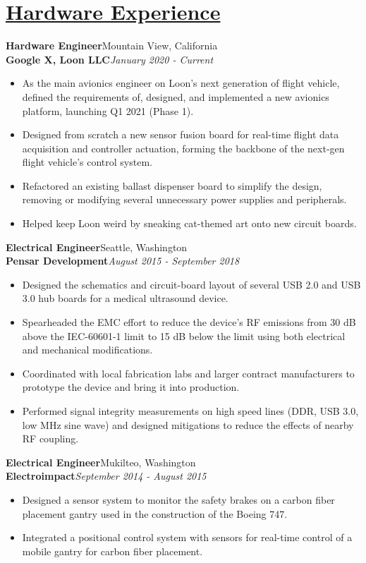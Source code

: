 \documentclass[a4paper, 11pt]{article}
\begin{document}
\section{\underline{Hardware Experience}}
  \textbf{Hardware Engineer}\hfill Mountain View, California\\
  \textbf{Google X, Loon LLC}\hfill \emph{January 2020 - Current}\smallskip
  \begin{itemize}[nosep]
    \item As the main avionics engineer on Loon's next generation of flight vehicle, defined the requirements of, designed, and implemented a new avionics platform, launching Q1 2021 (Phase 1).
    \item Designed from scratch a new sensor fusion board for real-time flight data acquisition and controller actuation, forming the backbone of the next-gen flight vehicle's control system.
    \item Refactored an existing ballast dispenser board to simplify the design, removing or modifying several unnecessary power supplies and peripherals.
    \item Helped keep Loon weird by sneaking cat-themed art onto new circuit boards.
  \end{itemize}
  \medbreak
  
  \textbf{Electrical Engineer}\hfill Seattle, Washington\\
  \textbf{Pensar Development}\hfill \emph{August 2015 - September 2018}\smallskip
  \begin{itemize}[nosep]
    \item Designed the schematics and circuit-board layout of several USB 2.0 and USB 3.0 hub boards for a medical ultrasound device.
    \item Spearheaded the EMC effort to reduce the device's RF emissions from 30 dB above the IEC-60601-1 limit to 15 dB below the limit using both electrical and mechanical modifications.
    \item Coordinated with local fabrication labs and larger contract manufacturers to prototype the device and bring it into production.
    \item Performed signal integrity measurements on high speed lines (DDR, USB 3.0, low MHz sine wave) and designed mitigations to reduce the effects of nearby RF coupling.
  \end{itemize}
  \medskip
  
  \textbf{Electrical Engineer}\hfill Mukilteo, Washington\\
  \textbf{Electroimpact}\hfill \emph{September 2014 - August 2015}\smallskip
  \begin{itemize}[nosep]
    \item Designed a sensor system to monitor the safety brakes on a carbon fiber placement gantry used in the construction of the Boeing 747.
    \item Integrated a positional control system with sensors for real-time control of a mobile gantry for carbon fiber placement.
  \end{itemize}
\end{document}
